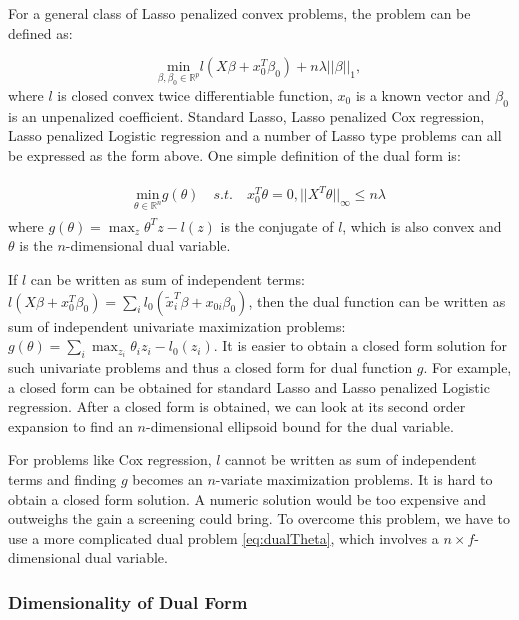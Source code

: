 For a general class of Lasso penalized convex problems, the problem can be defined as:

\begin{equation}
    \underset{\beta,\beta_0\in \mathbb{R}^p}{\mathrm{min}}l(X\beta+x_0^T\beta_0)+n\lambda||\beta||_1,
\end{equation}
where $l$ is closed convex twice differentiable function, $x_0$ is a known vector and $\beta_0$ is an unpenalized coefficient. Standard Lasso, Lasso penalized Cox regression, Lasso penalized Logistic regression and a number of Lasso type problems can all be expressed as the form above. One simple definition of the dual form is:

\begin{gather}
    \begin{aligned}
         \underset{\theta\in \mathbb{R}^n}{\mathrm{min}} g(\theta)\quad s.t.\quad x_0^T\theta=0,||X^T\theta||_\infty\leq n\lambda
    \end{aligned}
\end{gather}
where $g(\theta)=\max_z \theta^Tz-l(z)$ is the conjugate of $l$, which is also convex and $\theta$ is the $n$-dimensional dual variable.

If $l$ can be written as sum of independent terms: $l(X\beta+x_0^T\beta_0)=\sum_i l_0(\tilde{x}_i^T\beta+x_{0i}\beta_0)$, then the dual function can be written as sum of independent univariate maximization problems: $g(\theta)=\sum_i\max_{z_i} \theta_iz_i-l_0(z_i)$. It is easier to obtain a closed form solution for such univariate problems and thus a closed form for dual function $g$. For example, a closed form can be obtained for standard Lasso and Lasso penalized Logistic regression. After a closed form is obtained, we can look at its second order expansion to find an $n$-dimensional ellipsoid bound for the dual variable.

For problems like Cox regression, $l$ cannot be written as sum of independent terms and finding $g$ becomes an $n$-variate maximization problems. It is hard to obtain a closed form solution. A numeric solution would be too expensive and outweighs the gain a screening could bring. To overcome this problem, we have to use a more complicated dual problem \eqref{eq:dualTheta}, which involves a $n\times f$-dimensional dual variable. 

\subsubsection{Dimensionality of Dual Form}

